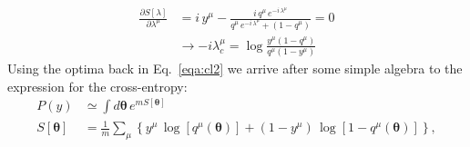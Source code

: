 \documentclass{article}
\begin{document}
%
\begin{align} \label{eqa:cl3}
\frac{\partial S[\lambda]}{\partial \lambda^{\mu}} &= i \, y^{\mu} - \frac{i \, q^{\mu} \, e^{-i \, \lambda^{\mu}}}{q^{\mu} \, e^{-i \, \lambda^{\mu}} + (1-q^{\mu})} = 0 \\ \nonumber
&\rightarrow - i \lambda^{\mu}_{c} =  \log \frac{y^{\mu}(1-q^{\mu}) }{q^{\mu}(1- y^{\mu})}
\end{align}
%
Using the optima back in Eq.~\eqref{eqa:cl2} we arrive after some simple algebra to the expression for the cross-entropy:
%
\begin{align} \label{eq:cl3}
P(y) &\simeq \int d\boldsymbol{\theta} \, e^{m S[\boldsymbol{\theta}]} \\ \nonumber
S[\boldsymbol{\theta}] &= \frac{1}{m} \sum_{\mu} \left\{ y^{\mu} \, \log [ q^{\mu}( \boldsymbol{\theta} ) ] + (1-y^{\mu}) \, \log [1-q^{\mu}( \boldsymbol{\theta}) ] \right\},
\end{align}
%
%
\end{document}
